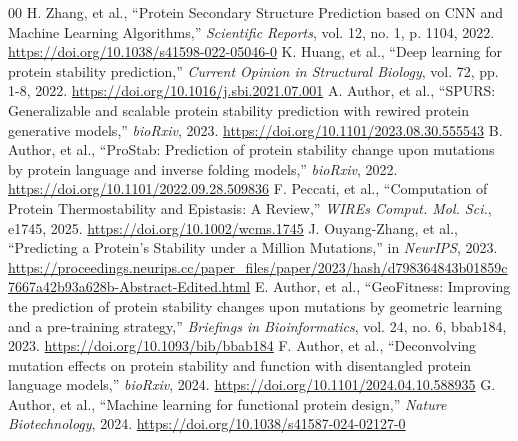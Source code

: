 \documentclass[conference]{IEEEtran}
\begin{document}
\begin{thebibliography}{00}
 H. Zhang, et al., ``Protein Secondary Structure Prediction based on CNN and Machine Learning Algorithms,'' \textit{Scientific Reports}, vol. 12, no. 1, p. 1104, 2022. \url{https://doi.org/10.1038/s41598-022-05046-0}
 K. Huang, et al., ``Deep learning for protein stability prediction,'' \textit{Current Opinion in Structural Biology}, vol. 72, pp. 1-8, 2022. \url{https://doi.org/10.1016/j.sbi.2021.07.001}
 A. Author, et al., ``SPURS: Generalizable and scalable protein stability prediction with rewired protein generative models,'' \textit{bioRxiv}, 2023. \url{https://doi.org/10.1101/2023.08.30.555543}
 B. Author, et al., ``ProStab: Prediction of protein stability change upon mutations by protein language and inverse folding models,'' \textit{bioRxiv}, 2022. \url{https://doi.org/10.1101/2022.09.28.509836}
 F. Peccati, et al., ``Computation of Protein Thermostability and Epistasis: A Review,'' \textit{WIREs Comput. Mol. Sci.}, e1745, 2025. \url{https://doi.org/10.1002/wcms.1745}
 J. Ouyang-Zhang, et al., ``Predicting a Protein's Stability under a Million Mutations,'' in \textit{NeurIPS}, 2023. \url{https://proceedings.neurips.cc/paper_files/paper/2023/hash/d798364843b01859c7667a42b93a628b-Abstract-Edited.html}
 E. Author, et al., ``GeoFitness: Improving the prediction of protein stability changes upon mutations by geometric learning and a pre-training strategy,'' \textit{Briefings in Bioinformatics}, vol. 24, no. 6, bbab184, 2023. \url{https://doi.org/10.1093/bib/bbab184}
 F. Author, et al., ``Deconvolving mutation effects on protein stability and function with disentangled protein language models,'' \textit{bioRxiv}, 2024. \url{https://doi.org/10.1101/2024.04.10.588935}
 G. Author, et al., ``Machine learning for functional protein design,'' \textit{Nature Biotechnology}, 2024. \url{https://doi.org/10.1038/s41587-024-02127-0}
\end{thebibliography}
\end{document}
